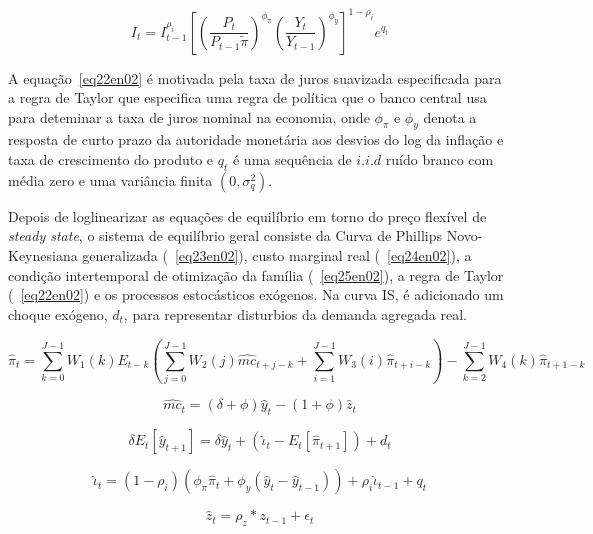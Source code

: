 \documentclass[twoside,a4paper,11pt]{report}
\begin{document}
{{\begin{equation}\label{eq22en02}
{I}_{t}={I}_{t-1}^{{\rho}_{i}}{[{(\frac{{P}_{t}}{{P}_{t-1}\tilde{\pi}})}^{{\phi}_{\pi}}{(\frac{{Y}_{t}}{{Y}_{t-1}})}^{{\phi}_{y}} ]}^{1-{\rho}_{i}}{e}^{{q}_{t}}
\end{equation}

A equação~\ref{eq22en02} é motivada pela taxa de juros suavizada especificada para a regra de Taylor que especifica uma regra de política que o banco central usa para deteminar a taxa de juros nominal na economia, onde ${\phi}_{\pi}$ e ${\phi}_{y}$ denota a resposta de curto prazo da autoridade monetária aos desvios do log da inflação e taxa de crescimento do produto e $q_{t}$ é uma sequência de $i.i.d$ ruído branco com média zero e uma variância finita $(0,{\sigma}_{q}^{2})$. 

Depois de loglinearizar as equações de equilíbrio em torno do preço flexível de \emph{steady state}, o sistema de equilíbrio geral consiste da Curva de Phillips Novo-Keynesiana generalizada (~\ref{eq23en02}), custo marginal real (~\ref{eq24en02}), a condição intertemporal de otimização da família (~\ref{eq25en02}), a regra de Taylor (~\ref{eq22en02}) e os processos estocásticos exógenos. Na curva IS, é adicionado um choque exógeno, $d_{t}$, para representar disturbios da demanda agregada real.

\begin{equation}\label{eq23en02}
{\hat{\pi}}_{t}=\sum_{k=0}^{J-1}{{W}_{1}(k)}{E}_{t-k}(\sum_{j=0}^{J-1}{{W}_{2}(j){\hat{mc}}_{t+j-k}+\sum_{i=1}^{J-1}{{W}_{3}(i){\hat{\pi}}_{t+i-k}}})-\sum_{k=2}^{J-1}{{W}_{4}(k){\hat{\pi}}_{t+1-k}} 
\end{equation}

\begin{equation}\label{eq24en02}
{\hat{mc}}_{t}=(\delta +\phi){\hat{y}}_{t}-(1+\phi){\hat{z}}_{t}
\end{equation}

\begin{equation}\label{eq25en02}
\delta{E}_{t}[{\hat{y}}_{t+1}]=\delta{\hat{y}}_{t}+({\hat{\iota}}_{t}-{E}_{t}[{\hat{\pi}}_{t+1}])+{d}_{t}
\end{equation}

\begin{equation}\label{eq26en02}
{\hat{\iota}}_{t}=(1-{\rho}_{i})({\phi}_{\pi}{\hat{\pi}}_{t}+{\phi}_{y}({\hat{y}}_{t}-{\hat{y}}_{t-1}))+{\rho}_{i}{\hat{\iota}}_{t-1}+{q}_{t}
\end{equation}

\begin{equation}\label{eq27en02}
{\hat{z}}_{t}={\rho}_{z}\ast {z}_{t-1}+{\epsilon}_{t}
\end{equation}

}}
\end{document}
